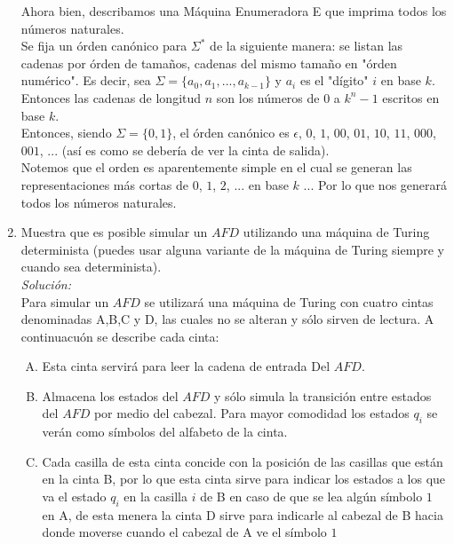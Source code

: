 \documentclass[letterpaper,10pt]{article}
\begin{document}
\begin{enumerate}
       Ahora bien, describamos una Máquina Enumeradora E que imprima todos los
       números naturales. \\
       Se fija un órden canónico para $\Sigma^{*}$ de la siguiente manera: se listan 
       las cadenas por órden de tamaños, cadenas del mismo tamaño en "órden numérico".
       Es decir, sea $\Sigma = \{a_0, a_1, ..., a_{k-1}\}$ y $a_i$ es el "dígito" $i$
       en base $k$. Entonces las cadenas de longitud $n$ son los números de $0$ a
       $k^{n}-1$ escritos en base $k$. \\ 
       Entonces, siendo $\Sigma = \{0, 1\}$, el órden canónico es $\epsilon$, $0$, $1$,
       $00$, $01$, $10$, $11$, $000$, $001$, $...$ (así es como se debería de ver la
       cinta de salida). \\
       Notemos que el orden es aparentemente simple en el cual se generan las
       representaciones más cortas de $0$, $1$, $2$, $...$ en base $k$ $...$ Por lo
       que nos generará todos los números naturales.
       
       \item Muestra que es posible simular un $AFD$ utilizando una máquina
       de Turing determinista (puedes usar alguna variante de la máquina de
       Turing siempre y cuando sea determinista).\\
            \textit{Solución:}\\
       			Para simular un $AFD$ se utilizará una máquina de Turing con cuatro cintas denominadas A,B,C y D, las cuales no se alteran y sólo sirven de lectura. A continuacuón se describe cada cinta:
       			\begin{enumerate}[A)]
       				\item Esta cinta servirá para leer la cadena de entrada Del $AFD$. 
       				
       				\item Almacena los estados del $AFD$ y sólo simula la transición entre estados del $AFD$ por medio del cabezal. Para mayor comodidad los estados $q_i$ se verán como símbolos del alfabeto de la cinta. 
       				
       				\item Cada casilla de esta cinta concide con la posición de las casillas que están en la cinta B, por lo que esta cinta sirve para indicar los estados a los que va el estado $q_i$ en la casilla $i$ de B en caso de que se lea algún símbolo $1$ en A, de esta menera la cinta D sirve para indicarle al cabezal de B hacia donde moverse cuando el cabezal de A ve el símbolo $1$ 
       				

\end{enumerate}
\end{enumerate}
\end{document}

